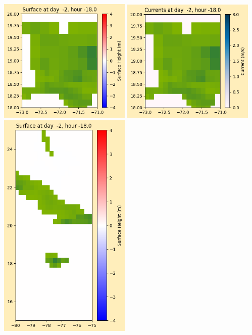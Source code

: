 \documentclass[11pt]{article}
\begin{document}
\vskip 10pt 
\includegraphics[width=0.475\textwidth]{frame0001fig1005.png}
\includegraphics[width=0.475\textwidth]{frame0001fig1006.png}
\vskip 10pt 
\includegraphics[width=0.475\textwidth]{frame0001fig1007.png}
\end{document}
